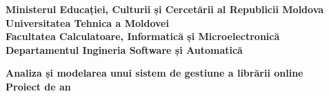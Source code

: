 \begin{titlepage}
    \begin{center}

        \textbf{\large{ Ministerul Educației, Culturii și Cercetării al Republicii Moldova \\ }}
        \textbf{\large{ Universitatea Tehnica a Moldovei \\}}
        \textbf{\large{ Facultatea Calculatoare, Informatică și Microelectronică \\}}
        \textbf{\large{ Departamentul Ingineria Software și Automatică \\}}
        \vspace{6cm}

        {\LARGE {\bf{ Analiza și modelarea unui sistem de gestiune a librării online }}}\\
        \vspace{1cm}
        \textbf{\LARGE { Proiect de an \\}}
    \end{center}

    \vfill
    \begin{center}
    \end{center}


    \vfill
\end{titlepage}
